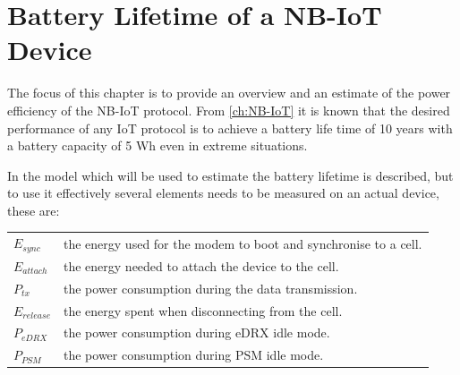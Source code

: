 \chapter{Battery Lifetime of a NB-IoT Device}

The focus of this chapter is to provide an overview and an estimate of the power efficiency of the NB-IoT protocol. From \autoref{ch:NB-IoT} it is known that the desired performance of any IoT protocol is to achieve a battery life time of 10 years with a battery capacity of 5 Wh even in extreme situations. 

In  the model which will be used to estimate the battery lifetime is described, but to use it effectively several elements needs to be measured on an actual device, these are:

\begin{tabular}{ll}
$E_{sync}$ & the energy used for the modem to boot and synchronise to a cell. \\
$E_{attach}$ & the energy needed to attach the device to the cell. \\
$P_{tx}$ & the power consumption during the data transmission. \\
$E_{release}$ & the energy spent when disconnecting from the cell. \\
$P_{eDRX}$ & the power consumption during \gls{eDRX} idle mode. \\
$P_{PSM}$ & the power consumption during \gls{PSM} idle mode. \\
\end{tabular}


